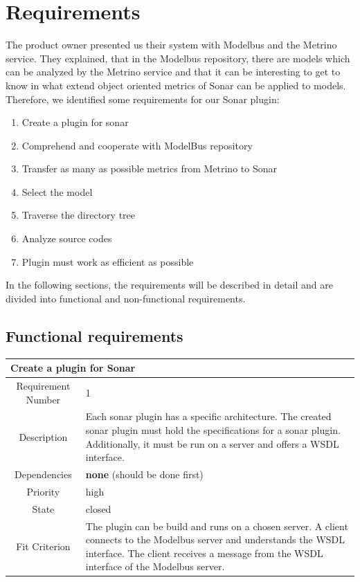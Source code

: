\section{Requirements}
The product owner presented us their system with Modelbus and the Metrino service. They explained, that in the Modelbus repository, there are models which can be analyzed by the Metrino service and that it can be interesting to get to know in what extend object oriented metrics of Sonar can be applied to models. Therefore, we identified some requirements for our Sonar plugin:
\begin{enumerate}
\item Create a plugin for sonar 
\item Comprehend and cooperate with ModelBus repository
\item Transfer as many as possible metrics from Metrino to Sonar
\item Select the model
\item Traverse the directory tree
\item Analyze source codes
\item Plugin must work as efficient as possible
\end{enumerate}
In the following sections, the requirements will be described in detail and are divided into functional and non-functional requirements.

\subsection{Functional requirements}

\begin{table}[H]
\begin{tabular}{|c|p{10cm}|}
\hline 
\multicolumn{2}{|l|}{\textbf{Create a plugin for Sonar}} \\ 
\hline 
Requirement Number & 1 \\ \hline 
Description & Each sonar plugin has a specific architecture. The created sonar plugin must hold the specifications for a sonar plugin. Additionally, it must be run on a server and offers a WSDL interface. \\ \hline 
Dependencies & \textbf{none} (should be done first) \\ \hline 
Priority & high \\ \hline 
State & closed \\ \hline 
Fit Criterion & The plugin can be build and runs on a chosen server. A client connects to the Modelbus server and understands the WSDL interface. The client receives a message from the WSDL interface of the Modelbus server. \\ \hline 
\end{tabular}
\end{table}

